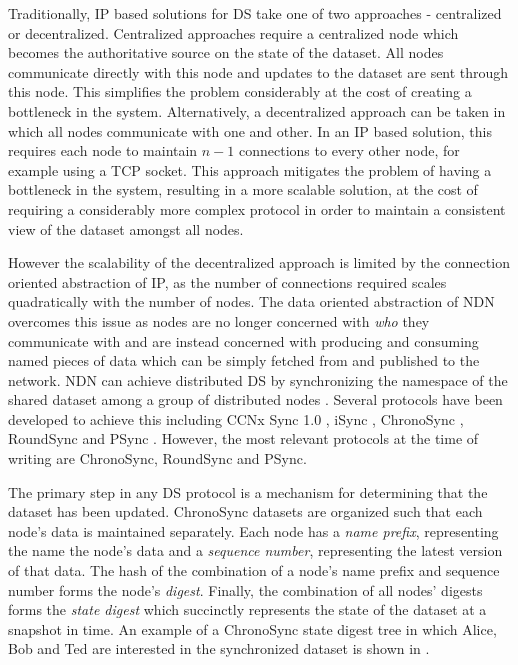 Traditionally, IP based solutions for DS take one of two approaches - centralized or decentralized. Centralized approaches require a centralized node which becomes the authoritative source on the state of the dataset. All nodes communicate directly with this node and updates to the dataset are sent through this node. This simplifies the problem considerably at the cost of creating a bottleneck in the system. Alternatively, a decentralized approach can be taken in which all nodes communicate with one and other. In an IP based solution, this requires each node to maintain $n-1$ connections to every other node, for example using a TCP socket. This approach mitigates the problem of having a bottleneck in the system, resulting in a more scalable solution, at the cost of requiring a considerably more complex protocol in order to maintain a consistent view of the dataset amongst all nodes.

However the scalability of the decentralized approach is limited by the connection oriented abstraction of IP, as the number of connections required scales quadratically with the number of nodes. The data oriented abstraction of NDN overcomes this issue as nodes are no longer concerned with \textit{who} they communicate with and are instead concerned with producing and consuming named pieces of data which can be simply fetched from and published to the network. NDN can achieve distributed DS by synchronizing the namespace of the shared dataset among a group of distributed nodes \cite{sync-survey}. Several protocols have been developed to achieve this including CCNx Sync 1.0 \cite{ccnx-sync}, iSync \cite{isync}, ChronoSync \cite{chronosync}, RoundSync \cite{roundsync} and PSync \cite{psync}. However, the most relevant protocols at the time of writing are ChronoSync, RoundSync and PSync.


The primary step in any DS protocol is a mechanism for determining that the dataset has been updated. ChronoSync datasets are organized such that each node's data is maintained separately. Each node has a \textit{name prefix}, representing the name the node's data and a \textit{sequence number}, representing the latest version of that data. The hash of the combination of a node's name prefix and sequence number forms the node's \textit{digest}. Finally, the combination of all nodes' digests forms the \textit{state digest} which succinctly represents the state of the dataset at a snapshot in time. An example of a ChronoSync state digest tree in which Alice, Bob and Ted are interested in the synchronized dataset is shown in .  

